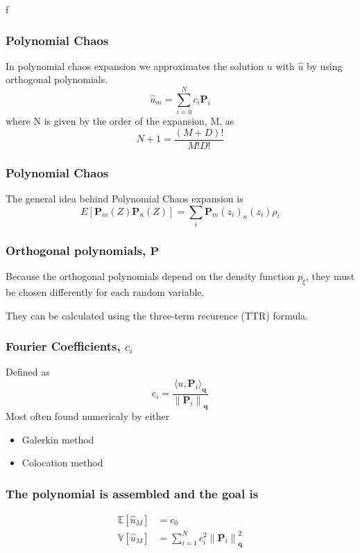 \documentclass[handout]{beamer}
\newcommand{\p}{\boldsymbol{P}}
\newcommand{\q}{\boldsymbol{q}}
\newcommand{\norm}[1]{\left\lVert#1\right\rVert}
\begin{document}
 

\if f
  



\begin{frame}
  \frametitle{Polynomial Chaos}
  In polynomial chaos expansion we approximates the solution $u$ with $\hat u$ by using orthogonal polynomials.
  \[\hat u_m = \sum_{i=0}^N c_i \p_i\]
  where N is given by the order of the expansion, M, as
  \[N + 1 =\frac{(M + D)!}{M!D!}\]
\end{frame}


\begin{frame}
  \frametitle{Polynomial Chaos}
  The general idea behind Polynomial Chaos expansion is
  \[E[\p_m(Z)\p_n(Z)] = \sum_i \p_m(z_i)_n(z_i)\rho_i\]
\end{frame}



\begin{frame}
  \frametitle{Orthogonal polynomials, $\p$}
  Because the orthogonal polynomials depend on the density function $p_\xi$, they must be chosen differently for each random variable.\newline

  They can be calculated using the three-term recurence (TTR) formula.\newline

\end{frame}


\begin{frame}
  \frametitle{Fourier Coefficients, $c_i$}
  Defined as
  \[c_i = \frac{\langle u,\p_i\rangle_{\q}}{\norm{\p_i}_{\q}}\]
  Most often found numericaly by either
  \begin{itemize}
    \item Galerkin method
    \item Colocation method
  \end{itemize}
\end{frame}


\begin{frame}
  \frametitle{The polynomial is assembled and the goal is}
  \begin{align*}
  \mathbb E[\hat u_M] &= c_0\\
  \mathbb V[\hat u_M] &= \sum_{i=1}^N c_i^2\norm{\p_i}_{\q}^2
  \end{align*}
\end{frame}
\end{document}
